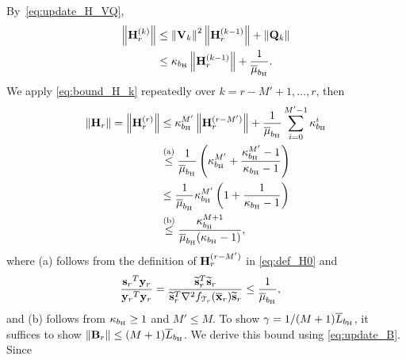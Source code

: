\documentclass[10pt,twocolumn,journal]{IEEEtran}
\begin{document}
By~\eqref{eq:update_H_VQ}, 
\begin{align}
\left\Vert\mathbf{H}^{(k)}_r\right\Vert &\le \left\Vert\mathbf{V}_k\right\Vert^2\left\Vert\mathbf{H}^{(k-1)}_r\right\Vert + \left\Vert\mathbf{Q}_k\right\Vert \nonumber\\ 
&\le \kappa_{b_{\mathrm{H}}}\left\Vert\mathbf{H}^{(k-1)}_r\right\Vert+\frac{1}{\overline{\mu}_{b_{\mathrm{H}}}}. \label{eq:bound_H_k}
\end{align}
We apply \eqref{eq:bound_H_k} repeatedly over $k\!=\!r-M'+1,\ldots,r$, then %
\begin{align*}
\left\Vert\mathbf{H}_r\right\Vert=\left\Vert\mathbf{H}_r^{(r)}\right\Vert &\le \kappa_{b_{\mathrm{H}}}^{M'}\left\Vert\mathbf{H}_r^{(r-M')}\right\Vert + \frac{1}{\overline{\mu}_{b_{\mathrm{H}}}}\sum_{i=0}^{M'-1}\kappa_{b_{\mathrm{H}}}^i\\
&\stackrel{\rm(a)}{\le} \frac{1}{\overline{\mu}_{b_{\mathrm{H}}}}\left(\kappa_{b_{\mathrm{H}}}^{M'}+\frac{\kappa_{b_{\mathrm{H}}}^{M'}-1}{\kappa_{b_{\mathrm{H}}}-1}\right)\\
&\le \frac{1}{\overline{\mu}_{b_{\mathrm{H}}}}\kappa_{b_{\mathrm{H}}}^{M'}\left(1+\frac{1}{\kappa_{b_{\mathrm{H}}}-1}\right)\\
&\stackrel{\rm(b)}{\le} \frac{\kappa_{b_{\mathrm{H}}}^{M+1}}{\overline{\mu}_{b_{\mathrm{H}}}(\kappa_{b_{\mathrm{H}}}-1)},
\end{align*}
where (a) follows from the definition of $\mathbf{H}_r^{(r-M')}$ in \eqref{eq:def_H0} and 
\begin{align}
\frac{{\mathbf{s}_r}^T\mathbf{y}_r}{{\mathbf{y}_r}^T\mathbf{y}_r} &= \frac{{\widetilde{\mathbf{s}}_r}^T\widetilde{\mathbf{s}}_r}{{\widetilde{\mathbf{s}}_r}^T\nabla^2 f_{\mathcal{T}_r}(\overline{\bf x}_r)\widetilde{\mathbf{s}}_r}\le \frac{1}{\overline{\mu}_{b_{\mathrm{H}}}},
\end{align}
and (b) follows from $\kappa_{b_{\mathrm{H}}}\ge 1$ and $M'\le M$. 
To show $\gamma = {1}/{(M+1)\overline{L}_{b_{\mathrm{H}}}}$, it suffices to show $\left\Vert\mathbf{B}_r\right\Vert\le (M+1)\overline{L}_{b_{\mathrm{H}}}$.
We derive this bound using \eqref{eq:update_B}. Since %
\end{document}
